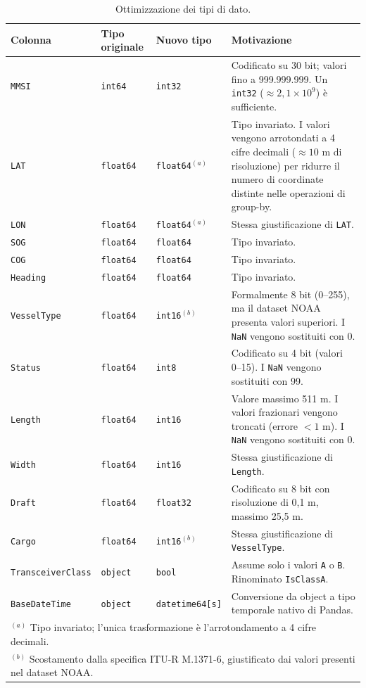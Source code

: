 \begin{table}[htbp]
\centering
\caption{Ottimizzazione dei tipi di dato.}\label{tab:dtype_optimization}
\begin{tabular}{lllp{5.5cm}}
\toprule
\textbf{Colonna} & \textbf{Tipo originale} & \textbf{Nuovo tipo} & \textbf{Motivazione} \\
\midrule
\texttt{MMSI} & \texttt{int64} & \texttt{int32} & Codificato su 30 bit; valori fino a 999.999.999. Un \texttt{int32} ($\approx 2{,}1 \times 10^9$) è sufficiente. \\
\texttt{LAT} & \texttt{float64} & \texttt{float64}$^{(a)}$ & Tipo invariato. I valori vengono arrotondati a 4 cifre decimali ($\approx 10$ m di risoluzione) per ridurre il numero di coordinate distinte nelle operazioni di group-by. \\
\texttt{LON} & \texttt{float64} & \texttt{float64}$^{(a)}$ & Stessa giustificazione di \texttt{LAT}. \\
\texttt{SOG} & \texttt{float64} & \texttt{float64} & Tipo invariato. \\
\texttt{COG} & \texttt{float64} & \texttt{float64} & Tipo invariato. \\
\texttt{Heading} & \texttt{float64} & \texttt{float64} & Tipo invariato. \\
\texttt{VesselType} & \texttt{float64} & \texttt{int16}$^{(b)}$ & Formalmente 8 bit (0--255), ma il dataset NOAA presenta valori superiori. I \texttt{NaN} vengono sostituiti con 0. \\
\texttt{Status} & \texttt{float64} & \texttt{int8} & Codificato su 4 bit (valori 0--15). I \texttt{NaN} vengono sostituiti con 99. \\
\texttt{Length} & \texttt{float64} & \texttt{int16} & Valore massimo 511 m. I valori frazionari vengono troncati (errore $< 1$ m). I \texttt{NaN} vengono sostituiti con 0. \\
\texttt{Width} & \texttt{float64} & \texttt{int16} & Stessa giustificazione di \texttt{Length}. \\
\texttt{Draft} & \texttt{float64} & \texttt{float32} & Codificato su 8 bit con risoluzione di 0,1 m, massimo 25,5 m. \\
\texttt{Cargo} & \texttt{float64} & \texttt{int16}$^{(b)}$ & Stessa giustificazione di \texttt{VesselType}. \\
\texttt{TransceiverClass} & \texttt{object} & \texttt{bool} & Assume solo i valori \texttt{A} o \texttt{B}. Rinominato \texttt{IsClassA}. \\
\texttt{BaseDateTime} & \texttt{object} & \texttt{datetime64[s]} & Conversione da object a tipo temporale nativo di Pandas. \\
\midrule
\multicolumn{4}{l}{\footnotesize $^{(a)}$ Tipo invariato; l'unica trasformazione è l'arrotondamento a 4 cifre decimali.} \\
\multicolumn{4}{l}{\footnotesize $^{(b)}$ Scostamento dalla specifica ITU-R M.1371-6, giustificato dai valori presenti nel dataset NOAA.} \\
\bottomrule
\end{tabular}
\end{table}

